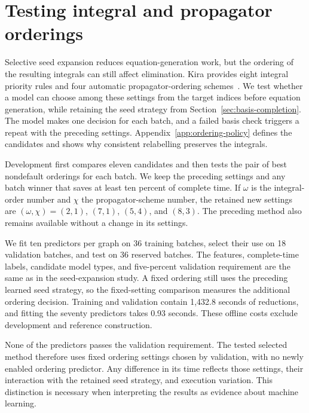 \providecommand{\StudySection}{\section}
\providecommand{\StudySubsection}{\subsection}

\StudySection{Testing integral and propagator orderings}
\label{sec:ordering-policy}
Selective seed expansion reduces equation-generation work, but the ordering of the resulting integrals can still affect elimination. Kira provides eight integral priority rules and four automatic propagator-ordering schemes~\cite{Kira12,Kira3}. We test whether a model can choose among these settings from the target indices before equation generation, while retaining the seed strategy from Section~\ref{sec:basis-completion}. The model makes one decision for each batch, and a failed basis check triggers a repeat with the preceding settings. Appendix~\ref{app:ordering-policy} defines the candidates and shows why consistent relabelling preserves the integrals.

Development first compares eleven candidates and then tests the pair of best nondefault orderings for each batch. We keep the preceding settings and any batch winner that saves at least ten percent of complete time. If $\omega$ is the integral-order number and $\chi$ the propagator-scheme number, the retained new settings are $(\omega,\chi)=(2,1)$, $(7,1)$, $(5,4)$, and $(8,3)$. The preceding method also remains available without a change in its settings.

We fit ten predictors per graph on 36 training batches, select their use on 18 validation batches, and test on 36 reserved batches. The features, complete-time labels, candidate model types, and five-percent validation requirement are the same as in the seed-expansion study. A fixed ordering still uses the preceding learned seed strategy, so the fixed-setting comparison measures the additional ordering decision. Training and validation contain 1,432.8 seconds of reductions, and fitting the seventy predictors takes 0.93 seconds. These offline costs exclude development and reference construction.

None of the predictors passes the validation requirement. The tested selected method therefore uses fixed ordering settings chosen by validation, with no newly enabled ordering predictor. Any difference in its time reflects those settings, their interaction with the retained seed strategy, and execution variation. This distinction is necessary when interpreting the results as evidence about machine learning.

